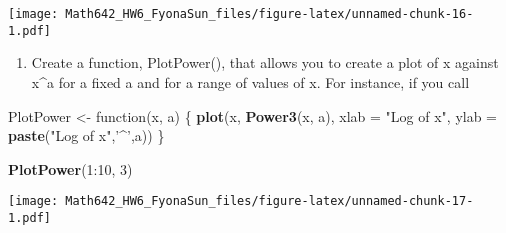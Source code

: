 \documentclass[]{article}
\newenvironment{Shaded}{\begin{snugshade}}{\end{snugshade}}
\newcommand{\KeywordTok}[1]{\textcolor[rgb]{0.13,0.29,0.53}{\textbf{{#1}}}}
\newcommand{\DataTypeTok}[1]{\textcolor[rgb]{0.13,0.29,0.53}{{#1}}}
\newcommand{\DecValTok}[1]{\textcolor[rgb]{0.00,0.00,0.81}{{#1}}}
\newcommand{\StringTok}[1]{\textcolor[rgb]{0.31,0.60,0.02}{{#1}}}
\newcommand{\NormalTok}[1]{{#1}}
\providecommand{\tightlist}{%
  \setlength{\itemsep}{0pt}\setlength{\parskip}{0pt}}
\begin{document}
\texttt{[image: Math642\_HW6\_FyonaSun\_files/figure-latex/unnamed-chunk-16-1.pdf]}

\begin{enumerate}
\def\labelenumi{(\alph{enumi})}
\setcounter{enumi}{5}
\tightlist
\item
  Create a function, PlotPower(), that allows you to create a plot of x
  against x\^{}a for a fixed a and for a range of values of x. For
  instance, if you call
\end{enumerate}

\begin{Shaded}
\begin{Highlighting}[]
\NormalTok{PlotPower <-}\StringTok{ }\NormalTok{function(x, a) \{}
    \KeywordTok{plot}\NormalTok{(x, }\KeywordTok{Power3}\NormalTok{(x, a), }\DataTypeTok{xlab =} \StringTok{"Log of x"}\NormalTok{, }\DataTypeTok{ylab =} \KeywordTok{paste}\NormalTok{(}\StringTok{"Log of x"}\NormalTok{,}\StringTok{'^'}\NormalTok{,a))}
\NormalTok{\}}

\KeywordTok{PlotPower}\NormalTok{(}\DecValTok{1}\NormalTok{:}\DecValTok{10}\NormalTok{, }\DecValTok{3}\NormalTok{)}
\end{Highlighting}
\end{Shaded}

\texttt{[image: Math642\_HW6\_FyonaSun\_files/figure-latex/unnamed-chunk-17-1.pdf]}
\end{document}
